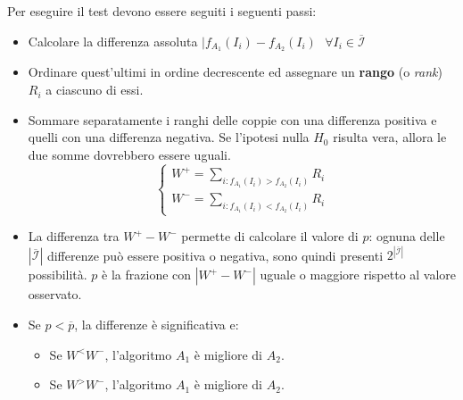 \documentclass{article}
\newcommand{\ovcal}[1]{\overline{\mathcal{#1}}}
\begin{document}
Per eseguire il test devono essere seguiti i seguenti passi:
\begin{itemize}
    \item Calcolare la differenza assoluta $|f_{A_1}(I_i)-f_{A_2}(I_i)\text{   }\forall I_i\in\ovcal{I}$
    \item Ordinare quest'ultimi in ordine decrescente ed assegnare un \textbf{rango} (o \textit{rank})
          $R_i$ a ciascuno di essi.
    \item Sommare separatamente i ranghi delle coppie con una differenza positiva e quelli con
          una differenza negativa. Se l'ipotesi nulla $H_0$ risulta vera, allora le due somme dovrebbero
          essere uguali.
          \[
              \begin{cases}
                  W^+ =\sum_{i:f_{A_1}(I_i)>f_{A_2}(I_i)}R_i \\
                  W^- =\sum_{i:f_{A_1}(I_i)<f_{A_2}(I_i)}R_i
              \end{cases}
          \]
    \item La differenza tra $W^+-W^-$ permette di calcolare il valore di $p$: ognuna delle
          $|\ovcal{I}|$ differenze può essere positiva o negativa, sono quindi presenti $2^{|\ovcal{I}|}$
          possibilità. $p$ è la frazione con $|W^+-W^-|$ uguale o maggiore rispetto al valore osservato.
    \item Se $p<\overline{p}$, la differenze è significativa e:
          \begin{itemize}
              \item Se $W^<W^-$, l'algoritmo $A_1$ è migliore di $A_2$.
              \item Se $W^>W^-$, l'algoritmo $A_1$ è migliore di $A_2$.
          \end{itemize}
\end{itemize}
\end{document}
